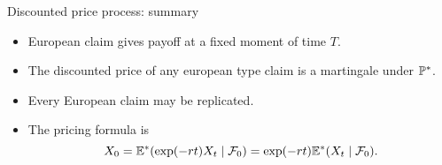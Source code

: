 \begin{frame}{Discounted price process: summary}
  
  \begin{itemize}[<+->]
      \item \alert{European claim} gives payoff at a fixed moment of time $T$.
      \item The \alert{discounted price} of any european type claim is 
      a martingale under $\P^*$.
      \item Every European claim may be \alert{replicated}.
      \item The \alert{pricing formula} is
      \[
        X_0 = \E^*(\exp(-rt)X_t\mid \cF_0) = \exp(-rt) \E^*(X_t \mid \cF_0).  
      \] 
  \end{itemize}
    
\end{frame}
  
